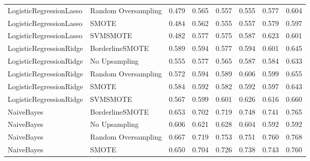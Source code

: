 \begin{tabular}{llllllll}
     LogisticRegressionLasso & Random Oversampling & 0.479 &                     0.565 &                 0.557 &                  0.555 &                                   0.577 &    0.604 \\
     LogisticRegressionLasso &               SMOTE & 0.484 &                     0.562 &                 0.555 &                  0.557 &                                   0.579 &    0.597 \\
     LogisticRegressionLasso &            SVMSMOTE & 0.482 &                     0.577 &                 0.575 &                  0.587 &                                   0.623 &    0.601 \\
     LogisticRegressionRidge &     BorderlineSMOTE & 0.589 &                     0.594 &                 0.577 &                  0.594 &                                   0.601 &    0.645 \\
     LogisticRegressionRidge &       No Upsampling & 0.555 &                     0.577 &                 0.565 &                  0.587 &                                   0.584 &    0.633 \\
     LogisticRegressionRidge & Random Oversampling & 0.572 &                     0.594 &                 0.589 &                  0.606 &                                   0.599 &    0.655 \\
     LogisticRegressionRidge &               SMOTE & 0.584 &                     0.592 &                 0.582 &                  0.592 &                                   0.597 &    0.643 \\
     LogisticRegressionRidge &            SVMSMOTE & 0.567 &                     0.599 &                 0.601 &                  0.626 &                                   0.616 &    0.660 \\
                  NaiveBayes &     BorderlineSMOTE & 0.653 &                     0.702 &                 0.719 &                  0.748 &                                   0.741 &    0.765 \\
                  NaiveBayes &       No Upsampling & 0.606 &                     0.621 &                 0.628 &                  0.604 &                                   0.592 &    0.592 \\
                  NaiveBayes & Random Oversampling & 0.667 &                     0.719 &                 0.753 &                  0.751 &                                   0.760 &    0.768 \\
                  NaiveBayes &               SMOTE & 0.650 &                     0.704 &                 0.726 &                  0.738 &                                   0.743 &    0.760 \\

\end{tabular}
